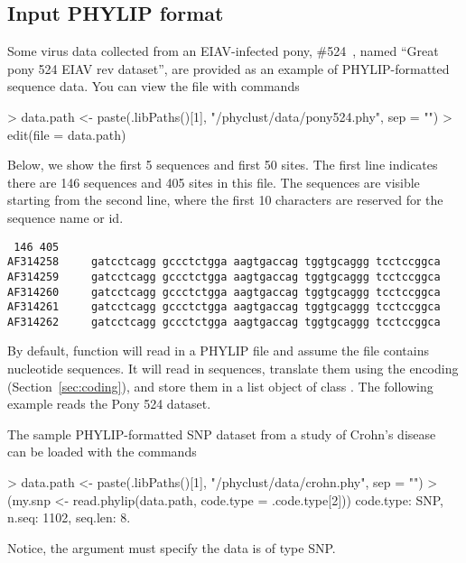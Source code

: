 \subsection[PHYLIP format]{Input PHYLIP format}
\label{sec:phylip}

Some virus data collected from an EIAV-infected pony, \#524~\citep{Baccam2003},
named ``Great pony 524 EIAV rev dataset'',
are provided as an example of PHYLIP-formatted sequence data.
You can view the file with commands
\begin{Code}
> data.path <- paste(.libPaths()[1], "/phyclust/data/pony524.phy", sep = "")
> edit(file = data.path)
\end{Code}
Below, we show the first 5 sequences and first 50 sites. The first line
indicates there are 146 sequences and 405 sites in this file. The sequences
are visible starting from the second line, where the first 10 characters are reserved for
the sequence name or id.
\begin{verbatim}
 146 405
AF314258     gatcctcagg gccctctgga aagtgaccag tggtgcaggg tcctccggca
AF314259     gatcctcagg gccctctgga aagtgaccag tggtgcaggg tcctccggca
AF314260     gatcctcagg gccctctgga aagtgaccag tggtgcaggg tcctccggca
AF314261     gatcctcagg gccctctgga aagtgaccag tggtgcaggg tcctccggca
AF314262     gatcctcagg gccctctgga aagtgaccag tggtgcaggg tcctccggca
\end{verbatim}

By default, function  will read in a PHYLIP file and
assume the file contains nucleotide sequences. It will read in sequences,
translate them using the encoding (Section~\ref{sec:coding}), and
store them in a list object of class .
The following example reads the Pony 524 dataset.

The sample PHYLIP-formatted SNP dataset from a study of Crohn's disease~\citep{Hugot2001} can be loaded with the commands
\begin{Code}
> data.path <- paste(.libPaths()[1], "/phyclust/data/crohn.phy", sep = "")
> (my.snp <- read.phylip(data.path, code.type = .code.type[2]))
code.type: SNP, n.seq: 1102, seq.len: 8.
\end{Code}
Notice, the  argument must specify the data is of type SNP.




